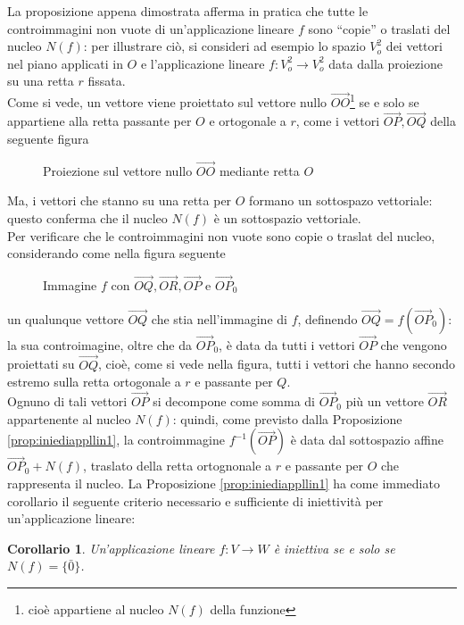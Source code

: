 \documentclass{book}
\theoremstyle{definition}
\theoremstyle{plain}
\newtheorem{corol}[section]{Corollario}
\begin{document}
La proposizione appena dimostrata afferma in pratica che tutte le controimmagini non vuote di
un'applicazione lineare $f$ sono ``copie'' o traslati del nucleo $N(f)$: per illustrare ciò,
si consideri ad esempio lo spazio $V_o^2$ dei vettori nel piano applicati in $O$ e l'applicazione
lineare $f:V_o^2\to V_o^2$ data dalla proiezione su una retta $r$ fissata.\\
Come si vede, un vettore viene proiettato sul vettore nullo $\vec{OO}$\footnote{cioè appartiene al
  nucleo $N(f)$ della funzione} se e solo se appartiene alla retta passante per $O$ e ortogonale a $r$,
come i vettori $\vec{OP}, \vec{OQ}$ della seguente figura
\begin{figure}[ht!]
  \centering
  \resizebox{7cm}{!}{}
  \caption{Proiezione sul vettore nullo $\vec{OO}$ mediante retta $O$}
  \label{fig:iniediappllin2}
\end{figure}
Ma, i vettori che stanno su una retta per $O$ formano un sottospazo vettoriale: questo conferma che
il nucleo $N(f)$ è un sottospazio vettoriale.\\
Per verificare che le controimmagini non vuote sono copie o traslat del nucleo, considerando come nella
figura seguente
\clearpage
\begin{figure}[ht!]
  \centering
  \resizebox{5cm}{!}{}
  \caption{Immagine $f$ con $\vec{OQ},\vec{OR},\vec{OP}$ e $\vec{OP}_0$}
  \label{fig:iniediappllin3}
\end{figure}
un qualunque vettore $\vec{OQ}$ che stia nell'immagine di $f$, definendo $\vec{OQ}=f(\vec{OP}_0)$:
la sua controimagine, oltre che da $\vec{OP}_0$, è data da tutti i vettori $\vec{OP}$ che vengono
proiettati su $\vec{OQ}$, cioè, come si vede nella figura, tutti i vettori che hanno secondo estremo
sulla retta ortogonale a $r$ e passante per $Q$.\\
Ognuno di tali vettori $\vec{OP}$ si decompone come somma di $\vec{OP}_0$ più un vettore $\vec{OR}$
appartenente al nucleo $N(f)$: quindi, come previsto dalla Proposizione \ref{prop:iniediappllin1},
la controimmagine $f^{-1}(\vec{OP})$ è data dal sottospazio affine $\vec{OP}_0+N(f)$, traslato della
retta ortognonale a $r$ e passante per $O$ che rappresenta il nucleo. La Proposizione
\ref{prop:iniediappllin1} ha come immediato corollario il seguente criterio necessario e sufficiente
di iniettività per un'applicazione lineare:
\begin{corol}
  \label{corol:iniediappllin1}
  Un'applicazione lineare $f:V\to W$ è iniettiva se e solo se $N(f)=\{\bar{0}\}$. 
\end{corol}
\end{document}
